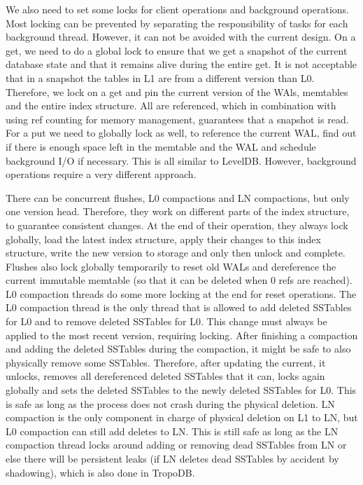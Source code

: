 We also need to set some locks for client operations and background operations. Most locking can be prevented by separating the responsibility of tasks for each background thread.  However, it can not be avoided with the current design. On a get, we need to do a global lock to ensure that we get a snapshot of the current database state and that it remains alive during the entire get. It is not acceptable that in a snapshot the tables in L1 are from a different version than L0. Therefore, we lock on a get and pin the current version of the WAls, memtables and the entire index structure. All are referenced, which in combination with using ref counting for memory management, guarantees that a snapshot is read. For a put we need to globally lock as well, to reference the current WAL, find out if there is enough space left in the memtable and the WAL and schedule background I/O if necessary. This is all similar to LevelDB. However, background operations require a very different approach. 

There can be concurrent flushes, L0 compactions and LN compactions, but only one version head. Therefore, they work on different parts of the index structure, to guarantee consistent changes. At the end of their operation, they always lock globally, load the latest index structure, apply their changes to this index structure, write the new version to storage and only then unlock and complete. Flushes also lock globally temporarily to reset old WALs and dereference the current immutable memtable (so that it can be deleted when 0 refs are reached). L0 compaction threads do some more locking at the end for reset operations. The L0 compaction thread is the only thread that is allowed to add deleted SSTables for L0 and to remove deleted SSTables for L0. This change must always be applied to the most recent version, requiring locking. After finishing a compaction and adding the deleted SSTables during the compaction, it might be safe to also physically remove some SSTables. Therefore, after updating the current, it unlocks, removes all dereferenced deleted SSTables that it can, locks again globally and sets the deleted SSTables to the newly deleted SSTables for L0. This is safe as long as the process does not crash during the physical deletion.  LN compaction is the only component in charge of physical deletion on L1 to LN, but L0 compaction can still add deletes to LN. This is still safe as long as the LN compaction thread locks around adding or removing dead SSTables from LN or else there will be persistent leaks (if LN deletes dead SSTables by accident by shadowing), which is also done in TropoDB.

